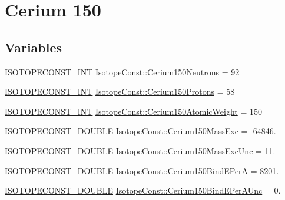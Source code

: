 \hypertarget{group___isotope_const-_cerium-_ce150}{}\section{Cerium 150}
\label{group___isotope_const-_cerium-_ce150}
\subsection*{Variables}
\begin{DoxyCompactItemize}
\item 
\mbox{\hyperlink{group___isotope_const-_macros_ga5f18360b3e99483a35c32d789e62621c}{I\+S\+O\+T\+O\+P\+E\+C\+O\+N\+S\+T\+\_\+\+I\+NT}} \mbox{\hyperlink{group___isotope_const-_cerium-_ce150_gacd2351115b0703b6cbfe7d288c8bd288}{Isotope\+Const\+::\+Cerium150\+Neutrons}} = 92
\item 
\mbox{\hyperlink{group___isotope_const-_macros_ga5f18360b3e99483a35c32d789e62621c}{I\+S\+O\+T\+O\+P\+E\+C\+O\+N\+S\+T\+\_\+\+I\+NT}} \mbox{\hyperlink{group___isotope_const-_cerium-_ce150_ga89471dacb8a57d0406c247efa7931728}{Isotope\+Const\+::\+Cerium150\+Protons}} = 58
\item 
\mbox{\hyperlink{group___isotope_const-_macros_ga5f18360b3e99483a35c32d789e62621c}{I\+S\+O\+T\+O\+P\+E\+C\+O\+N\+S\+T\+\_\+\+I\+NT}} \mbox{\hyperlink{group___isotope_const-_cerium-_ce150_ga81ecb5e7de02f0343a4fad44a26410c9}{Isotope\+Const\+::\+Cerium150\+Atomic\+Weight}} = 150
\item 
\mbox{\hyperlink{group___isotope_const-_macros_ga8f45a7272ce02c0b4c65c44636ed719a}{I\+S\+O\+T\+O\+P\+E\+C\+O\+N\+S\+T\+\_\+\+D\+O\+U\+B\+LE}} \mbox{\hyperlink{group___isotope_const-_cerium-_ce150_gaa1d74556e4cd7ab81f0f6e3ae9e58c56}{Isotope\+Const\+::\+Cerium150\+Mass\+Exc}} = -\/64846.
\item 
\mbox{\hyperlink{group___isotope_const-_macros_ga8f45a7272ce02c0b4c65c44636ed719a}{I\+S\+O\+T\+O\+P\+E\+C\+O\+N\+S\+T\+\_\+\+D\+O\+U\+B\+LE}} \mbox{\hyperlink{group___isotope_const-_cerium-_ce150_ga5c321db8014371d59313bb6b2cdecb7c}{Isotope\+Const\+::\+Cerium150\+Mass\+Exc\+Unc}} = 11.
\item 
\mbox{\hyperlink{group___isotope_const-_macros_ga8f45a7272ce02c0b4c65c44636ed719a}{I\+S\+O\+T\+O\+P\+E\+C\+O\+N\+S\+T\+\_\+\+D\+O\+U\+B\+LE}} \mbox{\hyperlink{group___isotope_const-_cerium-_ce150_gab300cc1eb866691797d7fcf954d3e7d4}{Isotope\+Const\+::\+Cerium150\+Bind\+E\+PerA}} = 8201.
\item 
\mbox{\hyperlink{group___isotope_const-_macros_ga8f45a7272ce02c0b4c65c44636ed719a}{I\+S\+O\+T\+O\+P\+E\+C\+O\+N\+S\+T\+\_\+\+D\+O\+U\+B\+LE}} \mbox{\hyperlink{group___isotope_const-_cerium-_ce150_ga0424dc01674c53f487b5e59006ae086b}{Isotope\+Const\+::\+Cerium150\+Bind\+E\+Per\+A\+Unc}} = 0.

\end{DoxyCompactItemize}
